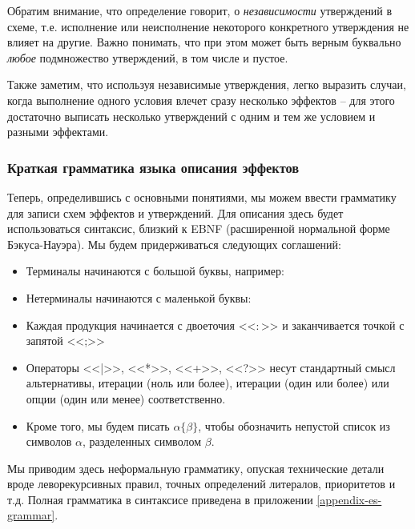 Обратим внимание, что определение говорит, о \emph{независимости} утверждений в схеме, т.е. исполнение или неисполнение некоторого конкретного утверждения не влияет на другие. Важно понимать, что при этом может быть верным буквально \emph{любое} подмножество утверждений, в том числе и пустое.

Также заметим, что используя независимые утверждения, легко выразить случаи, когда выполнение одного условия влечет сразу несколько эффектов -- для этого достаточно выписать несколько утверждений с одним и тем же условием и разными эффектами.




\subsubsection{Краткая грамматика языка описания эффектов}

Теперь, определившись с основными понятиями, мы можем ввести грамматику для записи схем эффектов и утверждений. 
Для описания здесь будет использоваться синтаксис, близкий к EBNF (расширенной нормальной форме Бэкуса-Науэра). Мы будем придерживаться следующих соглашений:

\begin{itemize}
    \item Терминалы начинаются с большой буквы, например: 
    
    \item Нетерминалы начинаются с маленькой буквы: 
    
    \item Каждая продукция начинается с двоеточия <<$\colon$>> и заканчивается точкой с запятой <<;>>
    
    \item Операторы <<|>>, <<*>>, <<+>>, <<?>> несут стандартный смысл альтернативы, итерации (ноль или более), итерации (один или более) или опции (один или менее) соответственно.
    
    \item Кроме того, мы будем писать $\alpha \{ \beta \}$, чтобы обозначить непустой список из символов $\alpha$, разделенных символом $\beta$. 
\end{itemize}

Мы приводим здесь неформальную грамматику, опуская технические детали вроде леворекурсивных правил, точных определений литералов, приоритетов и т.д.  Полная грамматика в синтаксисе  приведена в приложении \ref{appendix-es-grammar}.

